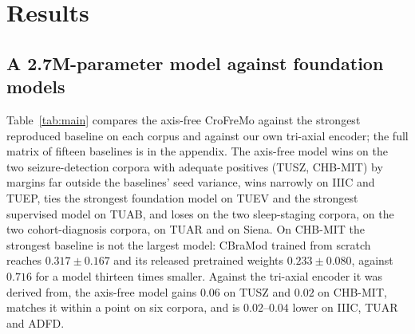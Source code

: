 \section{Results}
\label{sec:results}

\subsection{A 2.7M-parameter model against foundation models}
\label{sec:main}

Table~\ref{tab:main} compares the axis-free CroFreMo against the strongest
reproduced baseline on each corpus and against our own tri-axial encoder;
the full matrix of fifteen baselines is in the appendix. The axis-free
model wins on the two seizure-detection corpora with adequate positives
(TUSZ, CHB-MIT) by margins far outside the baselines' seed variance, wins
narrowly on IIIC and TUEP, ties the strongest foundation model on TUEV and
the strongest supervised model on TUAB, and loses on the two sleep-staging
corpora, on the two cohort-diagnosis corpora, on TUAR and on Siena. On
CHB-MIT the strongest baseline is not the largest model: CBraMod trained
from scratch reaches $0.317 \pm 0.167$ and its released pretrained weights
$0.233 \pm 0.080$, against $0.716$ for a model thirteen times smaller.
Against the tri-axial encoder it was derived from, the axis-free model
gains $0.06$ on TUSZ and $0.02$ on CHB-MIT, matches it within a point on
six corpora, and is $0.02$--$0.04$ lower on IIIC, TUAR and ADFD.


